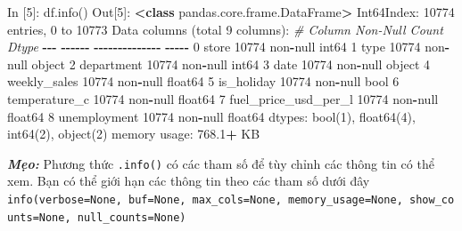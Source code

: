 \documentclass[
]{book}
\makeatletter
\newenvironment{Shaded}{\begin{snugshade}}{\end{snugshade}}
\newcommand{\BuiltInTok}[1]{#1}
\newcommand{\CommentTok}[1]{\textcolor[rgb]{0.56,0.35,0.01}{\textit{#1}}}
\newcommand{\DecValTok}[1]{\textcolor[rgb]{0.00,0.00,0.81}{#1}}
\newcommand{\FloatTok}[1]{\textcolor[rgb]{0.00,0.00,0.81}{#1}}
\newcommand{\KeywordTok}[1]{\textcolor[rgb]{0.13,0.29,0.53}{\textbf{#1}}}
\newcommand{\NormalTok}[1]{#1}
\newcommand{\OperatorTok}[1]{\textcolor[rgb]{0.81,0.36,0.00}{\textbf{#1}}}
\newcommand{\StringTok}[1]{\textcolor[rgb]{0.31,0.60,0.02}{#1}}
\newenvironment{kframe}{%
\medskip{}
\setlength{\fboxsep}{.8em}
 \def\at@end@of@kframe{}%
 \ifinner\ifhmode%
  \def\at@end@of@kframe{\end{minipage}}%
  \begin{minipage}{\columnwidth}%
 \fi\fi%
 \def\FrameCommand##1{\hskip\@totalleftmargin \hskip-\fboxsep
 \colorbox{shadecolor}{##1}\hskip-\fboxsep
     \hskip-\linewidth \hskip-\@totalleftmargin \hskip\columnwidth}%
 \MakeFramed {\advance\hsize-\width
   \@totalleftmargin\z@ \linewidth\hsize
   \@setminipage}}%
 {\par\unskip\endMakeFramed%
 \at@end@of@kframe}
\newenvironment{rmdblock}[1]
  {
  \begin{itemize}
  \renewcommand{\labelitemi}{
    \raisebox{-.7\height}[0pt][0pt]{
      {\setkeys{Gin}{width=3em,keepaspectratio}\texttt{[image: images/\#1]}}
    }
  }
  \setlength{\fboxsep}{1em}
  \begin{kframe}
  \item
  }
  {
  \end{kframe}
  \end{itemize}
  }
\newenvironment{rmdtip}
  {\begin{rmdblock}{tip}}
  {\end{rmdblock}}
\makeatother
\begin{document}
\begin{Shaded}
\begin{Highlighting}[]
\NormalTok{In [}\DecValTok{5}\NormalTok{]: df.info()}
\NormalTok{Out[}\DecValTok{5}\NormalTok{]:}
\OperatorTok{\textless{}}\KeywordTok{class} \StringTok{\textquotesingle{}pandas.core.frame.DataFrame\textquotesingle{}}\OperatorTok{\textgreater{}}
\NormalTok{Int64Index: }\DecValTok{10774}\NormalTok{ entries, }\DecValTok{0}\NormalTok{ to }\DecValTok{10773}
\NormalTok{Data columns (total }\DecValTok{9}\NormalTok{ columns):}
 \CommentTok{\#   Column                Non{-}Null Count  Dtype  }
\OperatorTok{{-}{-}{-}}  \OperatorTok{{-}{-}{-}{-}{-}{-}}                \OperatorTok{{-}{-}{-}{-}{-}{-}{-}{-}{-}{-}{-}{-}{-}{-}}  \OperatorTok{{-}{-}{-}{-}{-}}  
 \DecValTok{0}\NormalTok{   store                 }\DecValTok{10774}\NormalTok{ non}\OperatorTok{{-}}\NormalTok{null  int64  }
 \DecValTok{1}   \BuiltInTok{type}                  \DecValTok{10774}\NormalTok{ non}\OperatorTok{{-}}\NormalTok{null  }\BuiltInTok{object} 
 \DecValTok{2}\NormalTok{   department            }\DecValTok{10774}\NormalTok{ non}\OperatorTok{{-}}\NormalTok{null  int64  }
 \DecValTok{3}\NormalTok{   date                  }\DecValTok{10774}\NormalTok{ non}\OperatorTok{{-}}\NormalTok{null  }\BuiltInTok{object} 
 \DecValTok{4}\NormalTok{   weekly\_sales          }\DecValTok{10774}\NormalTok{ non}\OperatorTok{{-}}\NormalTok{null  float64}
 \DecValTok{5}\NormalTok{   is\_holiday            }\DecValTok{10774}\NormalTok{ non}\OperatorTok{{-}}\NormalTok{null  }\BuiltInTok{bool}   
 \DecValTok{6}\NormalTok{   temperature\_c         }\DecValTok{10774}\NormalTok{ non}\OperatorTok{{-}}\NormalTok{null  float64}
 \DecValTok{7}\NormalTok{   fuel\_price\_usd\_per\_l  }\DecValTok{10774}\NormalTok{ non}\OperatorTok{{-}}\NormalTok{null  float64}
 \DecValTok{8}\NormalTok{   unemployment          }\DecValTok{10774}\NormalTok{ non}\OperatorTok{{-}}\NormalTok{null  float64}
\NormalTok{dtypes: }\BuiltInTok{bool}\NormalTok{(}\DecValTok{1}\NormalTok{), float64(}\DecValTok{4}\NormalTok{), int64(}\DecValTok{2}\NormalTok{), }\BuiltInTok{object}\NormalTok{(}\DecValTok{2}\NormalTok{)}
\NormalTok{memory usage: }\FloatTok{768.1}\OperatorTok{+}\NormalTok{ KB}
\end{Highlighting}
\end{Shaded}

\begin{rmdtip}
\textbf{\emph{Mẹo:}}
Phương thức \texttt{.info()} có các tham số để tùy chỉnh các thông tin có thể xem. Bạn có thể giới hạn các thông tin theo các tham số dưới đây
\texttt{info(verbose=None,\ buf=None,\ max\_cols=None,\ memory\_usage=None,\ show\_counts=None,\ null\_counts=None)}
\end{rmdtip}
\end{document}
